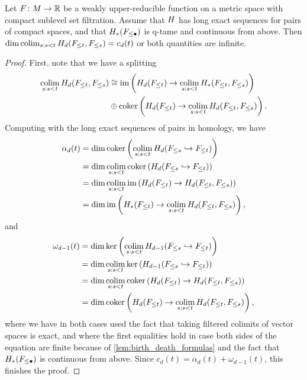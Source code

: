 \begin{prop}\label{prop:cap_limits}
	Let $F \colon M \to \mathbb{R}$ be a weakly upper-reducible function on a metric space with compact sublevel set filtration.
	Assume that $H$ has long exact sequences for pairs of compact spaces, and that $H_*(F_{\leq \bullet})$ is q-tame and continuous from above.
	Then $\dim \operatorname*{colim}_{s: s < t} H_d(F_{\leq t}, F_{\leq s}) = c_d(t)$ or both quantities are infinite.
\end{prop}
\begin{proof}
	First, note that we have a splitting
	\begin{align*}
	\operatorname*{colim}_{s: s < t} H_d(F_{\leq t}, F_{\leq s})
	&\cong \operatorname{im} \left( H_d(F_{\leq t}) \to \operatorname*{colim}_{s: s < t} H_*(F_{\leq t}, F_{\leq s}) \right) \\
	&\oplus \operatorname{coker} \left( H_d(F_{\leq t}) \to \operatorname*{colim}_{s: s < t} H_d(F_{\leq t}, F_{\leq s}) \right).
	\end{align*}
	Computing with the long exact sequences of pairs in homology, we have
	\begin{align*}
		\alpha_d(t)
		&= \dim \operatorname{coker} \left( \operatorname*{colim}_{s: s < t} H_d(F_{\leq s} \hookrightarrow F_{\leq t}) \right) \\
		&= \dim \operatorname*{colim}_{s: s < t} \operatorname{coker} \left( H_d(F_{\leq s} \hookrightarrow F_{\leq t}) \right) \\
		&= \dim \operatorname*{colim}_{s: s < t} \operatorname{im} \left( H_d(F_{\leq t}) \to H_d(F_{\leq t}, F_{\leq s}) \right) \\
		&= \dim \operatorname{im} \left( H_*(F_{\leq t}) \to \operatorname*{colim}_{s: s < t} H_d(F_{\leq t}, F_{\leq s}) \right), \\
	\end{align*}
	and
	\begin{align*}
		\omega_{d-1}(t)
		&= \dim \ker \left( \operatorname*{colim}_{s: s < t} H_{d-1}(F_{\leq s} \hookrightarrow F_{\leq t}) \right) \\
		&= \dim \operatorname*{colim}_{s: s < t} \ker \left( H_{d-1}(F_{\leq s} \hookrightarrow F_{\leq t}) \right) \\
		&= \dim \operatorname*{colim}_{s: s < t} \operatorname{coker} \left( H_d(F_{\leq t}) \to H_d(F_{\leq t}, F_{\leq s}) \right) \\
		&= \dim \operatorname{coker} \left( H_d(F_{\leq t}) \to \operatorname*{colim}_{s: s < t} H_d(F_{\leq t}, F_{\leq s}) \right), \\
	\end{align*}
	where we have in both cases used the fact that taking filtered colimits of vector spaces is exact, and where the first equalities hold in case both sides of the equation are finite because of \cref{lem:birth_death_formulas} and the fact that $H_*(F_{\leq \bullet})$ is continuous from above.
	Since $c_d(t) = \alpha_d(t) + \omega_{d-1}(t)$, this finishes the proof.
\end{proof}

